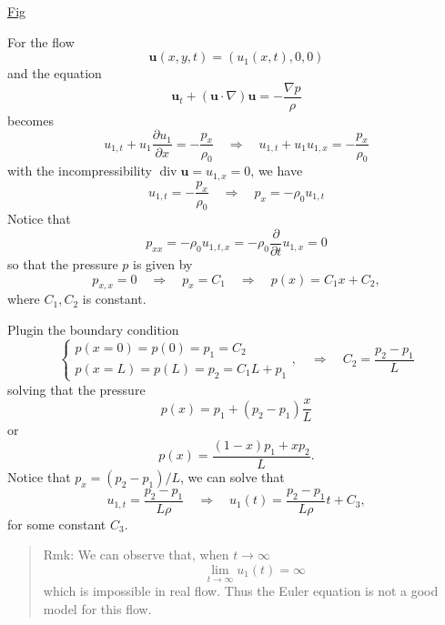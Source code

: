\underline{Fig}

For the flow
\begin{equation}
\textbf{u}(x,y,t) = \left(u_1(x,t),0,0\right)
\end{equation}
and the equation
\begin{equation}
\textbf{u}_t + (\textbf{u}\cdot \nabla)\textbf{u} = -\frac{\nabla p}{\rho}
\end{equation}
becomes
\begin{equation}
u_{1,t} + u_1\frac{\partial u_1}{\partial x} = -\frac{p_x}{\rho_{0}}
\quad\Rightarrow\quad
u_{1,t} + u_1u_{1,x} = -\frac{p_x}{\rho_{0}}
\end{equation}
with the incompressibility $\operatorname{div}\textbf{u} = u_{1,x} = 0$, we have 
\begin{equation}
u_{1,t} = -\frac{p_x}{\rho_{0}}
\quad\Rightarrow\quad
p_x = -\rho_{0} u_{1,t}
\end{equation}
Notice that
\begin{equation}
p_{xx} = -\rho_{0} u_{1,t,x} = -\rho_{0} \frac{\partial}{\partial t} u_{1,x} = 0
\end{equation}
so that the pressure $p$ is given by
\begin{equation}
p_{x,x} = 0
\quad\Rightarrow\quad
p_{x} = C_1
\quad\Rightarrow\quad
p(x) = C_1 x + C_2,
\end{equation}
where $C_1,C_2$ is constant.

Plugin the boundary condition
\begin{equation}
\begin{cases}
p(x=0) = p(0) = p_1 = C_2\\
p(x=L) = p(L) = p_2 = C_1L+p_1
\end{cases},\quad\Rightarrow\quad
C_2 = \frac{p_2-p_1}{L}
\end{equation}
solving that the pressure
\begin{equation}
p(x) = p_1 + \left(p_2-p_1\right)\frac{x}{L}
\end{equation}
or
\begin{equation}
p(x) = \frac{(1-x)p_1 + xp_2}{L}.
\end{equation}
Notice that $p_x = (p_2-p_1)/L$, we can solve that 
\begin{equation}
u_{1,t} = \frac{p_2-p_1}{L\rho}
\quad\Rightarrow\quad
u_{1}(t) = \frac{p_2-p_1}{L\rho} t + C_3,
\end{equation}
for some constant $C_3$.

\begin{quote}
	Rmk:
We can observe that, when $t\to\infty$
\begin{equation}
\lim_{t\to\infty} u_{1}(t) = \infty
\end{equation}
which is impossible in real flow. Thus the Euler equation is not a good model for this flow.
\end{quote}

